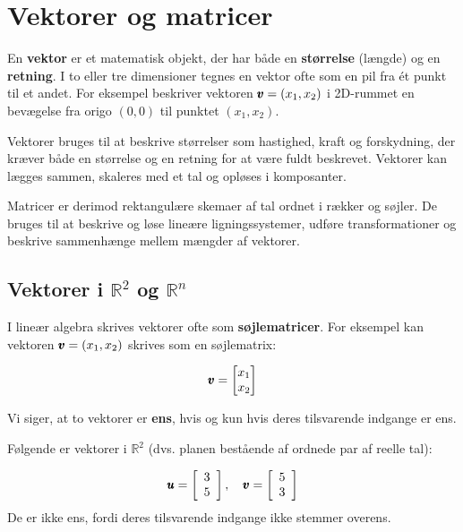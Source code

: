 \chapter{Vektorer og matricer}\label{chap:ch8}
En \textbf{vektor} er et matematisk objekt, der har både en \textbf{størrelse} (længde) og en \textbf{retning}. I to eller tre dimensioner tegnes en vektor ofte som en pil fra ét punkt til et andet. For eksempel beskriver vektoren \(\pmb{v} = (x_1, x_2)\) i 2D-rummet en bevægelse fra origo \((0,0)\) til punktet \((x_1, x_2)\).

Vektorer bruges til at beskrive størrelser som hastighed, kraft og forskydning, der kræver både en størrelse og en retning for at være fuldt beskrevet. Vektorer kan lægges sammen, skaleres med et tal og opløses i komposanter.

Matricer er derimod rektangulære skemaer af tal ordnet i rækker og søjler. De bruges til at beskrive og løse lineære ligningssystemer, udføre transformationer og beskrive sammenhænge mellem mængder af vektorer.

\section{Vektorer i \texorpdfstring{$\mathbb{R}^2$}{R2} og \texorpdfstring{$\mathbb{R}^n$}{Rn}}

I lineær algebra skrives vektorer ofte som \textbf{søjlematricer}. For eksempel kan vektoren \(\pmb{v} = (x_1, x_2)\) skrives som en søjlematrix:

\[ \pmb{v} = \begin{bmatrix} x_1 \\ x_2 \end{bmatrix} \]

Vi siger, at to vektorer er \textbf{ens}, hvis og kun hvis deres tilsvarende indgange er ens.

\begin{example}
    Følgende er vektorer i $\mathbb{R}^2$ (dvs. planen bestående af ordnede par af reelle tal):

    \[
    \pmb{u}=\left[\begin{array}{l}
    3 \\
    5
    \end{array}\right], \quad \pmb{v}=\left[\begin{array}{l}
    5 \\
    3
    \end{array}\right]
    \]
    De er ikke ens, fordi deres tilsvarende indgange ikke stemmer overens.
\end{example}

